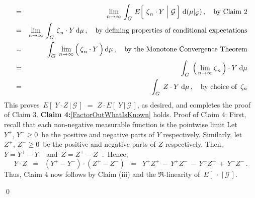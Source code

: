 \begin{enumerate}
\begin{eqnarray*}
	&=&
		\underset{n\rightarrow\infty}{\lim}\,
			\int_{G}\,
				E\!\left[\;\left.\overset{{\color{white}.}}{\zeta}_{n} \cdot Y\;\right\vert\,\mathcal{G}\,\right]
			\,\d(\mu\vert_{\mathcal{G}})
			\,,\quad\textnormal{by Claim 2}
	\\
	&=&
		\underset{n\rightarrow\infty}{\lim}\,
			\int_{G}\,
				\overset{{\color{white}.}}{\zeta}_{n} \cdot Y
			\,\d\mu
			\,,\quad\textnormal{by defining properties of conditional expectations}
	\\
	&=&
		\int_{G}\;
			\underset{n\rightarrow\infty}{\lim}\left(\,\overset{{\color{white}.}}{\zeta}_{n} \cdot Y\,\right)
			\d\mu
			\,,\quad\textnormal{by the Monotone Convergence Theorem}
	\\
	&=&
		\int_{G}\;
			\left(\,\underset{n\rightarrow\infty}{\lim}\,\overset{{\color{white}.}}{\zeta}_{n}\,\right) \cdot Y
			\;\d\mu
	\\
	&=&
		\int_{G}\; Z \cdot Y \;\d\mu
			\,,\quad\textnormal{by choice of \,$\zeta_{n}$}
	\end{eqnarray*}
	This proves \,$E\!\left[\;Y \cdot Z\,\vert\,\mathcal{G}\,\right]$ $=$ $Z \cdot E\!\left[\;Y\,\vert\,\mathcal{G}\,\right]$,
	as desired, and completes the proof of Claim 3.
	\vskip 0.4cm
	\textbf{Claim 4:}\;\;\eqref{FactorOutWhatIsKnown} holds.
	\vskip 0.0cm
	Proof of Claim 4: First, recall that each non-negative measurable function is the pointwise limit
	Let \,$Y^{+},\,Y^{-} \geq 0$\, be the positive and negative parts of $Y$ respectively.
	Similarly, let \,$Z^{+},\,Z^{-} \geq 0$\, be the positive and negative parts of $Z$ respectively.
	Then, \,$Y = Y^{+} - Y^{-}$\, and \,$Z = Z^{+} - Z^{-}$.\,
	Hence,
	\begin{equation*}
	Y \cdot Z
	\;\; = \;\; (Y^{+} - Y^{-}) \cdot (Z^{+} - Z^{-})
	\;\; = \;\; Y^{+}Z^{+} \,-\, Y^{+}Z^{-} \,-\, Y^{-}Z^{+} \,+\, Y^{-}Z^{-}\,.
	\end{equation*}
	Thus, Claim 4 now follows by Claim (iii) and the $\Re$-linearity of \,$E\!\left[\;\cdot\;\vert\,\mathcal{G}\,\right]$.
\end{enumerate}

\qed

